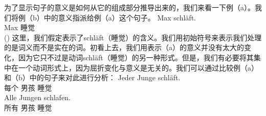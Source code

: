 为了显示句子的意义是如何从它的组成部分推导出来的，我们来看一下例（a）。我们将例（b）中的意义指派给例（a）这个句子。
\eal
\ex\label{Bsp-Max-schlaeft}
\gll Max schläft.\\
     Max 睡觉\\
\ex\label{Bsp-schlafen-max} 
()
\zl
这里，我们假定表示了schläft（睡觉）的含义。我们用初始符号来表示我们处理的是词义而不是实在的词。初看上去，我们用表示（a）的意义并没有太大的变化，因为它只不过是动词schläft（睡觉）的另一种形式。但是，我们有必要将其集中在一个动词形式上，因为屈折变化与意义是无关的。我们可以通过比较例（a）和（b）中的句子来对此进行分析：
\eal
\ex 
\gll Jeder Junge schläft.\\
     每个 男孩 睡觉\\
\ex 
\gll Alle Jungen schlafen.\\
     所有 男孩 睡觉\\
\zl

